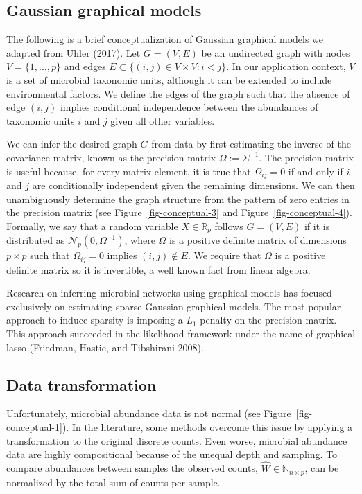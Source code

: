 \documentclass[
  a4paper,
]{article}
\begin{document}
\hypertarget{gaussian-graphical-models}{%
\subsection{Gaussian graphical models}\label{gaussian-graphical-models}}

The following is a brief conceptualization of Gaussian graphical models
we adapted from Uhler (2017). Let \(G = (V, E)\) be an undirected graph
with nodes \(V=\{1, \dots, p\}\) and edges
\(E \subset \{(i, j) \in V\times V : i<j\}\). In our application
context, \(V\) is a set of microbial taxonomic units, although it can be
extended to include environmental factors. We define the edges of the
graph such that the absence of edge \((i, j)\) implies conditional
independence between the abundances of taxonomic units \(i\) and \(j\)
given all other variables.

We can infer the desired graph \(G\) from data by first estimating the
inverse of the covariance matrix, known as the precision matrix
\(\Omega:= \Sigma^{-1}\). The precision matrix is useful because, for
every matrix element, it is true that \(\Omega_{ij}=0\) if and only if
\(i\) and \(j\) are conditionally independent given the remaining
dimensions. We can then unambiguously determine the graph structure from
the pattern of zero entries in the precision matrix (see
Figure~\ref{fig-conceptual-3} and Figure~\ref{fig-conceptual-4}).
Formally, we say that a random variable \(X \in \mathbb R_p\) follows
\(G = (V, E)\) if it is distributed as
\(\mathcal N_p(0, \Omega ^{-1})\), where \(\Omega\) is a positive
definite matrix of dimensions \(p\times p\) such that
\(\Omega_{ij} = 0\) implies \((i, j) \notin E\). We require that
\(\Omega\) is a positive definite matrix so it is invertible, a well
known fact from linear algebra.

Research on inferring microbial networks using graphical models has
focused exclusively on estimating sparse Gaussian graphical models. The
most popular approach to induce sparsity is imposing a \(L_1\) penalty
on the precision matrix. This approach succeeded in the likelihood
framework under the name of graphical lasso (Friedman, Hastie, and
Tibshirani 2008).

\hypertarget{data-transformation}{%
\subsection{Data transformation}\label{data-transformation}}

Unfortunately, microbial abundance data is not normal (see
Figure~\ref{fig-conceptual-1}). In the literature, some methods overcome
this issue by applying a transformation to the original discrete counts.
Even worse, microbial abundance data are highly compositional because of
the unequal depth and sampling. To compare abundances between samples
the observed counts, \(\hat W\in \mathbb N_{n \times p}\), can be
normalized by the total sum of counts per sample.
\end{document}
